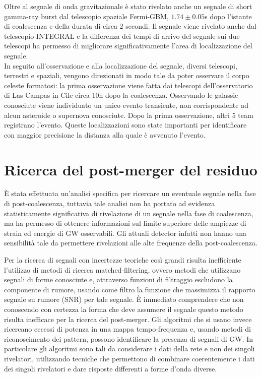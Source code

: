 Oltre al segnale di onda gravitazionale è stato rivelato anche un segnale di short gamma-ray burst dal telescopio spaziale Fermi-GBM, $1.74\pm0.05$s dopo l'istante di coalescenza e della durata di circa 2 secondi. Il segnale viene rivelato anche dal telescopio INTEGRAL e la differenza dei tempi di arrivo del segnale sui due telescopi ha permesso di migliorare significativamente l'area di localizzazione del segnale.\\
In seguito all'osservazione e alla localizzazione del segnale, diversi telescopi, terrestri e spaziali, vengono direzionati in modo tale da poter osservare il corpo celeste formatosi: la prima osservazione viene fatta dai telescopi dell'osservatorio di Las Campas in Cile circa 10h dopo la coalescenza. Osservando le galassie conosciute viene individuato un unico evento transiente, non corrispondente ad alcun asteroide o supernova conosciute. Dopo la prima osservazione, altri 5 team registrano l'evento. Queste localizzazioni sono state importanti per identificare con maggior precisione la distanza alla quale è avvenuto l'evento\cite{Abbott_2017c}.
\section{Ricerca del post-merger del residuo}
\label{section:postmergerGW170817}
È stata effettuata un'analisi specifica per ricercare un eventuale segnale nella fase di post-coalescenza, tuttavia tale analisi non ha portato ad evidenza statisticamente significativa di rivelazione di un segnale nella fase di coalescenza, ma ha permesso di ottenere informazioni sul limite superiore delle ampiezze di strain ed energie di GW osservabili. Gli attuali detector infatti non hanno una sensibilità tale da permettere rivelazioni alle alte frequenze della post-coalescenza.

Per la ricerca di segnali con incertezze teoriche così grandi risulta inefficiente l'utilizzo di metodi di ricerca matched-filtering, ovvero metodi che utilizzano segnali di forme conosciute e, attraverso funzioni di filtraggio escludono la componente di rumore, usando come filtro la funzione che massimizza il rapporto segnale su rumore (SNR) per tale segnale\cite{maggiore2008gravitational}. È immediato comprendere che non conoscendo con certezza la forma che deve assumere il segnale questo metodo risulta inefficace per la ricerca del post-merger. Gli algoritmi che si usano invece ricercano eccessi di potenza in una mappa tempo-frequenza e, usando metodi di riconoscimento dei pattern, possono identificare la presenza di segnali di GW. In particolare gli algoritmi sono tali da considerare i dati della rete e non dei singoli rivelatori, utilizzando tecniche che permettono di combinare coerentemente i dati dei singoli rivelatori e dare risposte differenti a forme d'onda diverse.


